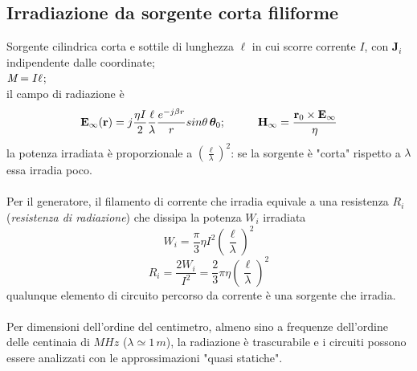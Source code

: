 \documentclass[a4paper]{article}
\begin{document}
\subsection*{Irradiazione da sorgente corta filiforme}
Sorgente cilindrica corta e sottile di lunghezza $\ell$ in cui scorre corrente $I$, con $\textbf{J}_i$ indipendente dalle coordinate;\\
$\emph{M}=I\ell$;\\
il campo di radiazione è
\begin{equation*}
\textbf{E}_\infty(\textbf{r})=j\frac{\eta I}{2}\frac{\ell}{\lambda}\frac{e^{-j\beta r}}{r}sin\theta\,\bm{\theta}_0;\hspace{10mm}\textbf{H}_\infty=\frac{\textbf{r}_0\times\textbf{E}_\infty}{\eta}
\end{equation*}
la potenza irradiata è proporzionale a $\left(\frac{\ell}{\lambda}\right)^2$: se la sorgente è "corta" rispetto a $\lambda$ essa irradia poco.\\\\
Per il generatore, il filamento di corrente che irradia equivale a una resistenza $R_i$ (\emph{resistenza di radiazione}) che dissipa la potenza $W_i$ irradiata
\begin{equation*}
W_i=\frac{\pi}{3}\eta I^2\left(\frac{\ell}{\lambda}\right)^2
\end{equation*}
\begin{equation*}
R_i=\frac{2W_i}{I^2}=\frac{2}{3}\pi\eta\left(\frac{\ell}{\lambda}\right)^2
\end{equation*}
qualunque elemento di circuito percorso da corrente è una sorgente che irradia.\\\\
Per dimensioni dell’ordine del centimetro, almeno sino a frequenze dell’ordine delle centinaia di $MHz$ ($\lambda\simeq1\,m$), la radiazione è trascurabile e i circuiti possono essere analizzati con le approssimazioni "quasi statiche".
\end{document}
